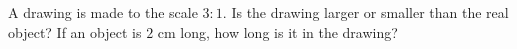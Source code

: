 A drawing is made to the scale $3:1$. Is the drawing larger or smaller than the real object? If an object is $2$ cm long, how long is it in the drawing?
